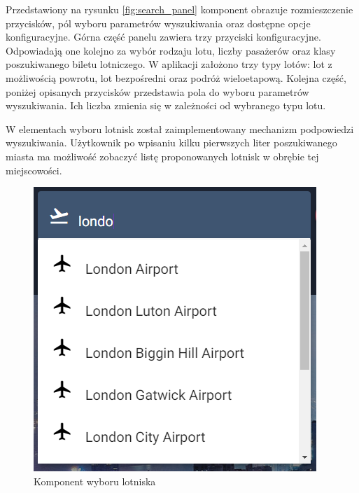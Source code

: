 \documentclass[12pt, twoside]{report}
\begin{document}
Przedstawiony na rysunku \ref{fig:search_panel} komponent obrazuje rozmieszczenie przycisków, pól wyboru parametrów wyszukiwania oraz dostępne opcje konfiguracyjne. Górna część panelu zawiera trzy przyciski konfiguracyjne. Odpowiadają one kolejno za wybór rodzaju lotu, liczby pasażerów oraz klasy poszukiwanego biletu lotniczego. W aplikacji założono trzy typy lotów: lot z możliwością powrotu, lot bezpośredni oraz podróż wieloetapową. Kolejna część, poniżej opisanych przycisków przedstawia pola do wyboru parametrów wyszukiwania. Ich liczba zmienia się w zależności od wybranego typu lotu.

W elementach wyboru lotnisk został zaimplementowany mechanizm podpowiedzi wyszukiwania. Użytkownik po wpisaniu kilku pierwszych liter poszukiwanego miasta ma możliwość zobaczyć listę proponowanych lotnisk w obrębie tej miejscowości. 
\begin{figure}[!ht]
\centering
\includegraphics[scale=0.8, keepaspectratio]{airport_choose.png}
\caption{Komponent wyboru lotniska}
\label{fig:airport_choose}
\end{figure}
\end{document}
